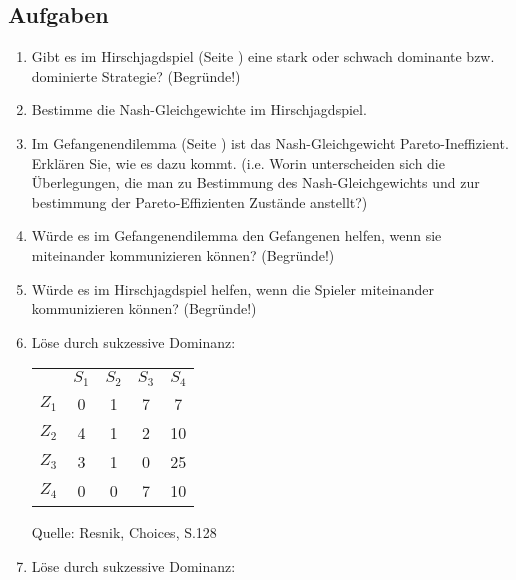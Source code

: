 \subsection{Aufgaben}

\begin{enumerate}
  \item Gibt es im Hirschjagdspiel (Seite \pageref{Hirschjagdspiel}) eine
  stark oder schwach dominante bzw. dominierte Strategie? (Begründe!)

  \item Bestimme die Nash-Gleichgewichte im Hirschjagdspiel.

  \item Im Gefangenendilemma (Seite \pageref{Gefangenendilemma}) ist das
  Nash-Gleichgewicht Pareto-Ineffizient. Erklären Sie, wie es dazu kommt.
  (i.e. Worin unterscheiden sich die Überlegungen, die man zu Bestimmung des
  Nash-Gleichgewichts und zur bestimmung der Pareto-Effizienten Zustände
  anstellt?)

  \item Würde es im Gefangenendilemma den Gefangenen helfen, wenn sie
  miteinander kommunizieren können? (Begründe!)
  
  \item Würde es im Hirschjagdspiel helfen, wenn die Spieler miteinander
  kommunizieren können? (Begründe!)

  \item Löse durch sukzessive Dominanz:

\begin{center}
\begin{tabular}{c|c|c|c|c|}
\multicolumn{1}{c}{} & 
\multicolumn{1}{c}{$S_1$} &
\multicolumn{1}{c}{$S_2$} &
\multicolumn{1}{c}{$S_3$} &
\multicolumn{1}{c}{$S_4$} \\ \cline{2-5}

$Z_1$ & 0 & 1 & 7 & 7  \\ \cline{2-5}
$Z_2$ & 4 & 1 & 2 & 10 \\ \cline{2-5}
$Z_3$ & 3 & 1 & 0 & 25 \\ \cline{2-5}
$Z_4$ & 0 & 0 & 7 & 10 \\ \cline{2-5}

\end{tabular}

{\footnotesize Quelle: Resnik, Choices, S.128 \cite[]{resnik:1987}}
\end{center}
 
  \item Löse durch sukzessive Dominanz:


\end{enumerate}
